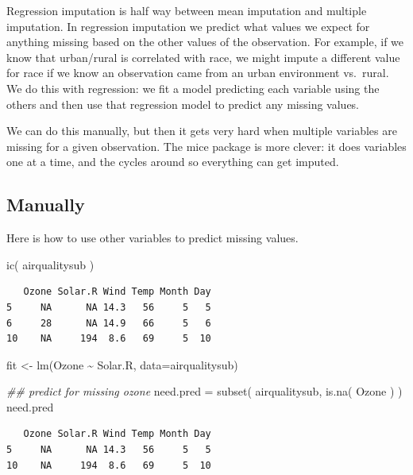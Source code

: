 \documentclass[
  letterpaper,
  DIV=11,
  numbers=noendperiod]{scrreprt}
\newenvironment{Shaded}{}{}
\newcommand{\AttributeTok}[1]{\textcolor[rgb]{0.49,0.56,0.16}{#1}}
\newcommand{\DocumentationTok}[1]{\textcolor[rgb]{0.73,0.13,0.13}{\textit{#1}}}
\newcommand{\FunctionTok}[1]{\textcolor[rgb]{0.02,0.16,0.49}{#1}}
\newcommand{\NormalTok}[1]{#1}
\newcommand{\OtherTok}[1]{\textcolor[rgb]{0.00,0.44,0.13}{#1}}
\newcommand{\SpecialCharTok}[1]{\textcolor[rgb]{0.25,0.44,0.63}{#1}}
\begin{document}
Regression imputation is half way between mean imputation and multiple
imputation. In regression imputation we predict what values we expect
for anything missing based on the other values of the observation. For
example, if we know that urban/rural is correlated with race, we might
impute a different value for race if we know an observation came from an
urban environment vs.~rural. We do this with regression: we fit a model
predicting each variable using the others and then use that regression
model to predict any missing values.

We can do this manually, but then it gets very hard when multiple
variables are missing for a given observation. The mice package is more
clever: it does variables one at a time, and the cycles around so
everything can get imputed.

\subsection{Manually}\label{manually}

Here is how to use other variables to predict missing values.

\begin{Shaded}
\begin{Highlighting}[]
  \FunctionTok{ic}\NormalTok{( airqualitysub )}
\end{Highlighting}
\end{Shaded}

\begin{verbatim}
   Ozone Solar.R Wind Temp Month Day
5     NA      NA 14.3   56     5   5
6     28      NA 14.9   66     5   6
10    NA     194  8.6   69     5  10
\end{verbatim}

\begin{Shaded}
\begin{Highlighting}[]
\NormalTok{  fit }\OtherTok{\textless{}{-}} \FunctionTok{lm}\NormalTok{(Ozone }\SpecialCharTok{\textasciitilde{}}\NormalTok{ Solar.R, }\AttributeTok{data=}\NormalTok{airqualitysub)}

\DocumentationTok{\#\# predict for missing ozone  }
\NormalTok{  need.pred }\OtherTok{=} \FunctionTok{subset}\NormalTok{( airqualitysub, }\FunctionTok{is.na}\NormalTok{( Ozone ) )}
\NormalTok{  need.pred}
\end{Highlighting}
\end{Shaded}

\begin{verbatim}
   Ozone Solar.R Wind Temp Month Day
5     NA      NA 14.3   56     5   5
10    NA     194  8.6   69     5  10
\end{verbatim}
\end{document}
